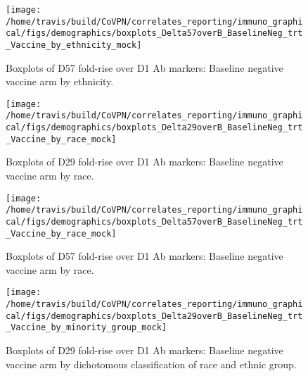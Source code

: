 \documentclass[]{book}
\theoremstyle{definition}
\theoremstyle{definition}
\theoremstyle{definition}
\newcommand{\1}{\mathbbm{1}}
\begin{document}
\clearpage
\begin{figure}[H]

{\centering \texttt{[image: /home/travis/build/CoVPN/correlates\_reporting/immuno\_graphical/figs/demographics/boxplots\_Delta57overB\_BaselineNeg\_trt\_Vaccine\_by\_ethnicity\_mock]} 

}

\caption{Boxplots of D57 fold-rise over D1 Ab markers: Baseline negative vaccine arm by ethnicity.}\label{fig:unnamed-chunk-151}
\end{figure}

\clearpage

\clearpage

\clearpage
\begin{figure}[H]

{\centering \texttt{[image: /home/travis/build/CoVPN/correlates\_reporting/immuno\_graphical/figs/demographics/boxplots\_Delta29overB\_BaselineNeg\_trt\_Vaccine\_by\_race\_mock]} 

}

\caption{Boxplots of D29 fold-rise over D1 Ab markers: Baseline negative vaccine arm by race.}\label{fig:unnamed-chunk-154}
\end{figure}

\clearpage
\begin{figure}[H]

{\centering \texttt{[image: /home/travis/build/CoVPN/correlates\_reporting/immuno\_graphical/figs/demographics/boxplots\_Delta57overB\_BaselineNeg\_trt\_Vaccine\_by\_race\_mock]} 

}

\caption{Boxplots of D57 fold-rise over D1 Ab markers: Baseline negative vaccine arm by race.}\label{fig:unnamed-chunk-155}
\end{figure}

\clearpage

\clearpage

\clearpage
\begin{figure}[H]

{\centering \texttt{[image: /home/travis/build/CoVPN/correlates\_reporting/immuno\_graphical/figs/demographics/boxplots\_Delta29overB\_BaselineNeg\_trt\_Vaccine\_by\_minority\_group\_mock]} 

}

\caption{Boxplots of D29 fold-rise over D1 Ab markers: Baseline negative vaccine arm by dichotomous classification of race and ethnic group.}\label{fig:unnamed-chunk-158}
\end{figure}
\end{document}
